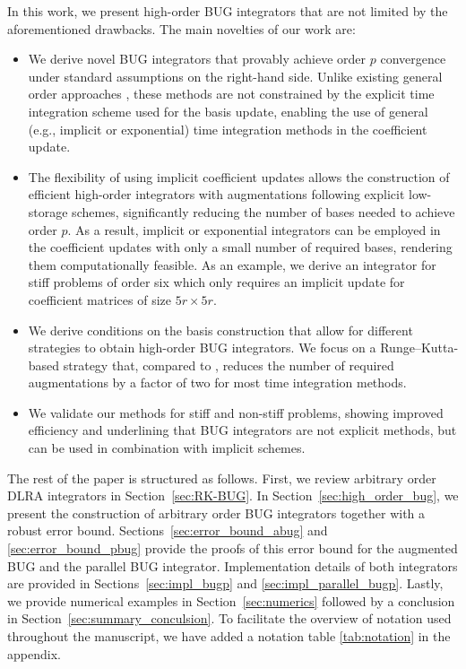\documentclass[preprint,runningheads]{svjour3}
\begin{document}
In this work, we present high-order BUG integrators that are not limited by the aforementioned drawbacks. The main novelties of our work are:
\begin{itemize}
    \item[(i)] We derive novel BUG integrators that provably achieve order $p$ convergence under standard assumptions on the right-hand side. Unlike existing general order approaches \cite{KiV19,nobile2025robust}, these methods are not constrained by the explicit time integration scheme used for the basis update, enabling the use of general (e.g., implicit or exponential) time integration methods in the coefficient update. 
    \item[(ii)] The flexibility of using implicit coefficient updates allows the construction of efficient high-order integrators with augmentations following explicit low-storage schemes, significantly reducing the number of bases needed to achieve order $p$. As a result, implicit or exponential integrators can be employed in the coefficient updates with only a small number of required bases, rendering them computationally feasible. As an example, we derive an integrator for stiff problems of order six which only requires an implicit update for coefficient matrices of size $5r \times 5r$. 
    \item[(iii)] We derive conditions on the basis construction that allow for different strategies to obtain high-order BUG integrators. We focus on a Runge--Kutta-based strategy that, compared to \cite{nobile2025robust}, reduces the number of required augmentations by a factor of two for most time integration methods. 
    \item[(iv)] We validate our methods for stiff and non-stiff problems, showing improved efficiency and underlining that BUG integrators are not explicit methods, but can be used in combination with implicit schemes. 
\end{itemize}
 {The rest of the paper is structured as follows. First, we review arbitrary order DLRA integrators in Section~\ref{sec:RK-BUG}. In Section~\ref{sec:high_order_bug}, we present the construction of arbitrary order BUG integrators together with a robust error bound. Sections~\ref{sec:error_bound_abug} and \ref{sec:error_bound_pbug} provide the proofs of this error bound for the augmented BUG and the parallel BUG integrator. Implementation details of both integrators are provided in Sections~\ref{sec:impl_bugp} and \ref{sec:impl_parallel_bugp}. Lastly, we provide numerical examples in Section~\ref{sec:numerics} followed by a conclusion in Section~\ref{sec:summary_conculsion}. To facilitate the overview of notation used throughout the manuscript, we have added a notation table \ref{tab:notation} in the appendix. }
 
\end{document}
